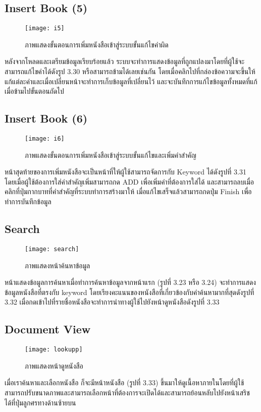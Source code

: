 \subsection{Insert Book (5)}
\begin{figure}[H]
    \centering
    \texttt{[image: i5]}
    \caption{ภาพแสดงขั้นตอนการเพิ่มหนังสือเข้าสู่ระบบขั้นแก้ไขคำผิด}\label{fig:i5}
\end{figure}
หลังจากโหลดและเตรียมข้อมูลเรียบร้อยแล้ว ระบบจะทำการแสดงข้อมูลที่ถูกแปลงมาโดยที่ผู้ใช้จะสามารถแก้ไขคำได้ดังรูป 3.30 หรือสามารถข้ามได้เลยเช่นกัน โดยเมื่อคลิกไปที่กล่องข้อความจะขึ้นให้แก้แต่ละคำและเมื่อเปลี่ยนหน้าจะทำการเก็บข้อมูลที่เปลี่ยนไว้ และจะบันทึกการแก้ไขข้อมูลทั้งหมดที่แก้เมื่อข้ามไปขั้นตอนถัดไป

\subsection{Insert Book (6) }
\begin{figure}[H]
    \centering
    \texttt{[image: i6]}
    \caption{ภาพแสดงขั้นตอนการเพิ่มหนังสือเข้าสู่ระบบขั้นแก้ไขและเพิ่มคำสำคัญ}\label{fig:i6}
\end{figure}
หน้าสุดท้ายของการเพิ่มหนังสือจะเป็นหน้าที่ให้ผู้ใช้สามารถจัดการกับ Keyword ได้ดังรูปที่ 3.31 โดยเมื่อผู้ใช้ต้องการใส่คำสำคัญเพิ่มสามารถกด ADD เพื่อเพิ่มคำที่ต้องการใส่ได้ และสามารถลบเมื่อคลิกที่ปุ่มกากบาทที่คำสำคัญที่ระบบทำการสร้างมาให้ เมื่อแก้ไขเสร็จแล้วสามารถกดปุ่ม Finish เพื่อทำการบันทึกข้อมูล

\subsection{Search}
\begin{figure}[H]
    \centering
    \texttt{[image: search]}
    \caption{ภาพแสดงหน้าค้นหาข้อมูล}\label{fig:search}
\end{figure}
หน้าแสดงข้อมูลการค้นหาเมื่อทำการค้นหาข้อมูลจากหน้าแรก (รูปที่ 3.23 หรือ 3.24) จะทำการแสดงข้อมูลหนังสือที่ตรงกับ keyword โดยเรียงคะแนนของหนังสือที่เกี่ยวข้องกับคำค้นหามากที่สุดดังรูปที่ 3.32 เมื่อกดเข้าไปที่รายชื่อหนังสือจะทำการนำทางผู้ใช้ไปยังหน้าดูหนังสือดังรูปที่ 3.33

\subsection{Document View}
\begin{figure}[H]
    \centering
    \texttt{[image: lookupp]}
    \caption{ภาพแสดงหน้าดูหนังสือ}\label{fig:lookupp}
\end{figure}
เมื่อเราค้นหาและเลือกหนังสือ ก็จะมีหน้าหนังสือ (รูปที่ 3.33) ขึ้นมาให้ดูเนื้อหาภายในโดยที่ผู้ใช้สามารถปรับขนาดภาพและสามารถเลือกหน้าที่ต้องการจะเปิดได้และสามารถย้อนหลับไปยังหน้าเสริชได้ที่ปุ่มลูกศรทางด้านซ้ายบน

